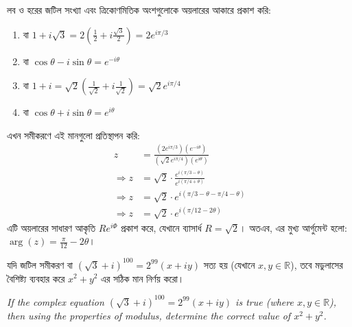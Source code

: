 \documentclass[12pt, a4paper]{article}
\begin{document}
\begin{tcolorbox}[solutionbox={সমাধান (Solution)}]
    \noindent
    লব ও হরের জটিল সংখ্যা এবং ত্রিকোণমিতিক অংশগুলোকে অয়লারের আকারে প্রকাশ করি:
    \begin{enumerate}
        \item বা $1+i\sqrt{3} = 2\left(\frac{1}{2} + i\frac{\sqrt{3}}{2}\right) = 2 e^{i\pi/3}$
        \item বা $\cos\theta - i\sin\theta = e^{-i\theta}$
        \item বা $1+i = \sqrt{2}\left(\frac{1}{\sqrt{2}} + i\frac{1}{\sqrt{2}}\right) = \sqrt{2} e^{i\pi/4}$
        \item বা $\cos\theta + i\sin\theta = e^{i\theta}$
    \end{enumerate}
    এখন সমীকরণে এই মানগুলো প্রতিস্থাপন করি:
    \begin{align*}
        z &= \frac{(2 e^{i\pi/3})(e^{-i\theta})}{(\sqrt{2} e^{i\pi/4})(e^{i\theta})} \\
        \Rightarrow z &= \sqrt{2} \cdot \frac{e^{i(\pi/3 - \theta)}}{e^{i(\pi/4 + \theta)}} \\
        \Rightarrow z &= \sqrt{2} \cdot e^{i(\pi/3 - \theta - \pi/4 - \theta)} \\
        \Rightarrow z &= \sqrt{2} \cdot e^{i(\pi/12 - 2\theta)}
    \end{align*}
    এটি অয়লারের সাধারণ আকৃতি $R e^{i\Phi}$ প্রকাশ করে, যেখানে ব্যাসার্ধ $R = \sqrt{2}$। অতএব, এর মুখ্য আর্গুমেন্ট হলো: $\arg(z) = \frac{\pi}{12} - 2\theta$।
\end{tcolorbox}

\vspace{1em}

\begin{tcolorbox}[questionbox={প্রশ্ন (Question) 25}]
    \noindent
    যদি জটিল সমীকরণ বা $(\sqrt{3} + i)^{100} = 2^{99}(x + iy)$ সত্য হয় (যেখানে $x, y \in \mathbb{R}$), তবে মডুলাসের বৈশিষ্ট্য ব্যবহার করে $x^2 + y^2$ এর সঠিক মান নির্ণয় করো।
    
    \vspace{0.8em}
    \begin{english}
    \noindent\textit{\color{darkgray}
    If the complex equation $(\sqrt{3} + i)^{100} = 2^{99}(x + iy)$ is true (where $x, y \in \mathbb{R}$), then using the properties of modulus, determine the correct value of $x^2 + y^2$.
    }
    \end{english}
\end{tcolorbox}
\end{document}
